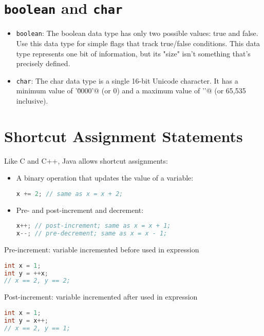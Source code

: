 \documentclass{article}
\begin{document}
\section{{\tt boolean} and {\tt char}}


\begin{itemize}
\item {\tt boolean}: The boolean data type has only two possible values: true and false. Use this data type for simple flags that track true/false conditions. This data type represents one bit of information, but its "size" isn't something that's precisely defined.

\item {\tt char}: The char data type is a single 16-bit Unicode character. It has a minimum value of \verb@'\u0000'@ (or 0) and a maximum value of \verb@'\uffff'@ (or 65,535 inclusive).
\end{itemize}





\section{Shortcut Assignment Statements}


Like C and C++, Java allows shortcut assignments:
\begin{itemize}
\item A binary operation that updates the value of a variable:
\begin{lstlisting}[language=Java]
x += 2; // same as x = x + 2;
\end{lstlisting}
\item Pre- and post-increment and decrement:
\begin{lstlisting}[language=Java]
x++; // post-increment; same as x = x + 1;
x--; // pre-decrement; same as x = x - 1;
\end{lstlisting}

\end{itemize}

\begin{multicols}{2}

Pre-increment: variable incremented before used in expression
\begin{lstlisting}[language=Java]
int x = 1;
int y = ++x;
// x == 2, y == 2;
\end{lstlisting}

\columnbreak

Post-increment: variable incremented after used in expression
\begin{lstlisting}[language=Java]
int x = 1;
int y = x++;
// x == 2, y == 1;
\end{lstlisting}

\end{multicols}
\end{document}
